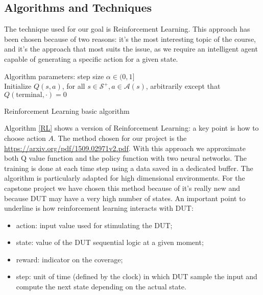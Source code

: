 \documentclass{article}
\begin{document}
\subsection{Algorithms and Techniques}
% 
% 
% 

The technique used for our goal is Reinforcement Learning. This approach has been chosen because of two reasons: it's the most interesting topic of the course, and it's the approach that most suits the issue, as we require an intelligent agent capable of generating a specific action for a given state.
\begin{algorithm}[H]
Algorithm parameters: step size $\alpha \in (0, 1]$ \\
Initialize $Q(s, a)$, for all $s \in \mathcal{S}^+, a \in \mathcal{A}(s)$, arbitrarily except that $Q(\mathrm{terminal}, \cdot) = 0$\;

 \caption{Reinforcement Learning basic algorithm}
 \label{RL}
\end{algorithm}
Algorithm \ref{RL} shows a version of Reinforcement Learning: a key point is how to choose action $A$. The method chosen for our project is the \href{actor-critic}{https://arxiv.org/pdf/1509.02971v2.pdf}. With this approach we approximate both Q value function and the policy function with two neural networks. The training is done at each time step using a data saved in a dedicated buffer. The algorithm is particularly adapted for high dimensional environments. For the capstone project we have chosen this method because of it's really new and because DUT may have a very high number of states. An important point to underline is how reinforcement learning interacts with DUT:
\begin{itemize}
\item action: input value used for stimulating the DUT;
\item state: value of the DUT sequential logic at a given moment;
\item reward: indicator on the coverage;
\item step: unit of time (defined by the clock) in which DUT sample the input and compute the next state depending on the actual state.
\end{itemize}
\end{document}
